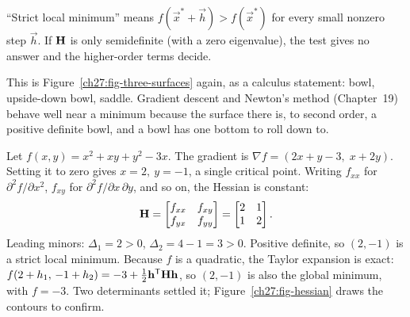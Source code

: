 ``Strict local minimum'' means $f(\vec{x}^*+\vec{h}) > f(\vec{x}^*)$ for every small nonzero step
$\vec{h}$. If $\mathbf{H}$ is only semidefinite (with a zero eigenvalue), the test gives no answer and
the higher-order terms decide.

This is Figure~\ref{ch27:fig-three-surfaces} again, as a calculus statement: bowl, upside-down bowl,
saddle. Gradient descent and Newton's method (Chapter~19) behave well near a minimum because the
surface there is, to second order, a positive definite bowl, and a bowl has one bottom to roll down
to.

\begin{example}
\label{ch27:ex-hessian}
Let $f(x,y) = x^2 + xy + y^2 - 3x$. The gradient is $\nabla f = (2x + y - 3,\; x + 2y)$. Setting it
to zero gives $x=2,\ y=-1$, a single critical point. Writing $f_{xx}$ for $\partial^2 f/\partial x^2$,
$f_{xy}$ for $\partial^2 f/\partial x\,\partial y$, and so on, the Hessian is constant:
\[
  \mathbf{H} = \begin{bmatrix} f_{xx} & f_{xy} \\ f_{yx} & f_{yy} \end{bmatrix}
  = \begin{bmatrix} 2 & 1 \\ 1 & 2 \end{bmatrix}.
\]
Leading minors: $\Delta_1 = 2 > 0$, $\Delta_2 = 4-1 = 3 > 0$. Positive definite, so $(2,-1)$ is a
strict local minimum. Because $f$ is a quadratic, the Taylor expansion is exact:
$f(2+h_1,\,-1+h_2) = -3 + \tfrac12\mathbf{h}^{\mathsf{T}}\mathbf{H}\mathbf{h}$, so $(2,-1)$ is also the global minimum,
with $f = -3$. Two determinants settled it; Figure~\ref{ch27:fig-hessian} draws the contours to
confirm.
\end{example}

